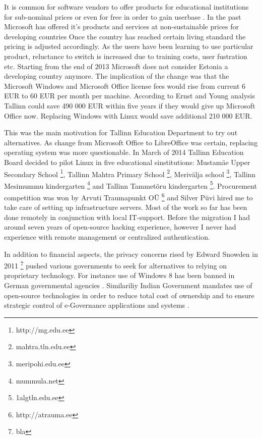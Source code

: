 \documentclass{article}
\begin{document}
It is common for software vendors to offer products for
educational institutions for sub-nominal prices or even for free
in order to gain userbase \cite{dreamspark} \cite{google-for-education}
\cite{apple-education-pricing}.
In the past
Microsoft has offered it's products and services at non-sustainable prices
for developing countries \cite{microsoft-giveaway}
Once the country has reached certain living standard the
pricing is adjusted accordingly.
As the users have been learning to use particular product,
reluctance to switch is increased due to training costs,
user fustration etc. 
Starting from the end of 2013 Microsoft does not consider Estonia a
developing country anymore. The implication of the change was that
the Microsoft Windows and Microsoft Office license fees would rise
from current 6 EUR to 60 EUR per month per machine.
According to Ernst and Young analysis Tallinn could save 490 000 EUR
within five years if they would give up Microsoft Office now.
Replacing Windows with Linux would save additional 210 000 EUR.
\cite{ernst-young-report}

This was the main motivation for Tallinn Education Department to try
out alternatives. As change from Microsoft Office to LibreOffice was
certain, replacing operating system was more questionable.
In March of 2014 Tallinn Education Board decided
to pilot Linux in five educational sinstitutions:
Mustamäe Upper Secondary School
\footnote{http://mg.edu.ee},
Tallinn Mahtra Primary School
\footnote{mahtra.tln.edu.ee},
Merivälja school
\footnote{meripohi.edu.ee},
Tallinn Mesimummu kindergarten
\footnote{mummula.net} and
Tallinn Tammetõru kindergarten
\footnote{1algtln.edu.ee}.
Procurement competition was won by Arvuti Traumapunkt OÜ
\footnote{http://atrauma.ee} and
Silver Püvi hired me to take care of setting up infrastructure servers.
Most of the work so far has been done remotely in conjunction with
local IT-support. Before the migration I had around seven years of
open-source hacking experience, however I never had experience with
remote management or centralized authentication.

In addition to financial aspects, the privacy concerns rised by
Edward Snowden in 2011
\footnote{bla}
pushed various governments to seek for alternatives
to relying on proprietary technology.
For instance use of Windows 8 has been banned in German governmental agencies
\cite{german-government-bans-windows-8}.
Similariliy Indian Government mandates use of open-source technologies
in order to reduce total cost of ownership and to ensure
strategic control of e-Governance applications and systems
\cite{open-source-adoption-at-government-of-india}.
\end{document}
